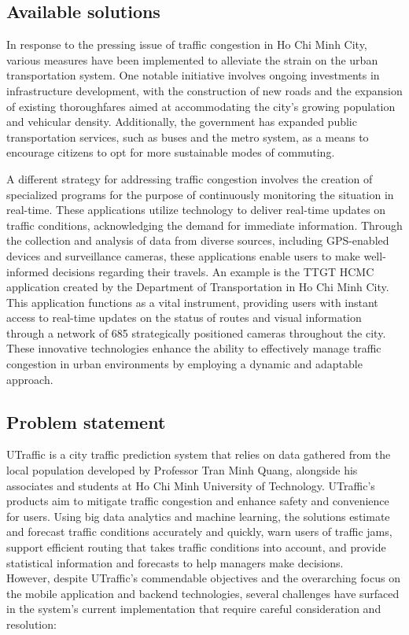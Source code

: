 \subsection{Available solutions}

In response to the pressing issue of traffic congestion in Ho Chi Minh City, various measures have been implemented to alleviate the strain on the urban transportation system. One notable initiative involves ongoing investments in infrastructure development, with the construction of new roads and the expansion of existing thoroughfares aimed at accommodating the city's growing population and vehicular density. Additionally, the government has expanded public transportation services, such as buses and the metro system, as a means to encourage citizens to opt for more sustainable modes of commuting.

A different strategy for addressing traffic congestion involves the creation of specialized programs for the purpose of continuously monitoring the situation in real-time. These applications utilize technology to deliver real-time updates on traffic conditions, acknowledging the demand for immediate information. Through the collection and analysis of data from diverse sources, including GPS-enabled devices and surveillance cameras, these applications enable users to make well-informed decisions regarding their travels. An example is the TTGT HCMC application created by the Department of Transportation in Ho Chi Minh City. This application functions as a vital instrument, providing users with instant access to real-time updates on the status of routes and visual information through a network of 685 strategically positioned cameras throughout the city. These innovative technologies enhance the ability to effectively manage traffic congestion in urban environments by employing a dynamic and adaptable approach.

\subsection{Problem statement}

UTraffic \cite{utraffic-introduction} is a city traffic prediction system that relies on data gathered from the local population developed by Professor Tran Minh Quang, alongside his associates and students at Ho Chi Minh University of Technology. UTraffic's products aim to mitigate traffic congestion and enhance safety and convenience for users. Using big data analytics and machine learning, the solutions estimate and forecast traffic conditions accurately and quickly, warn users of traffic jams, support efficient routing that takes traffic conditions into account, and provide statistical information and forecasts to help managers make decisions. \\
However, despite UTraffic's commendable objectives and the overarching focus on the mobile application and backend technologies, several challenges have surfaced in the system's current implementation that require careful consideration and resolution:

